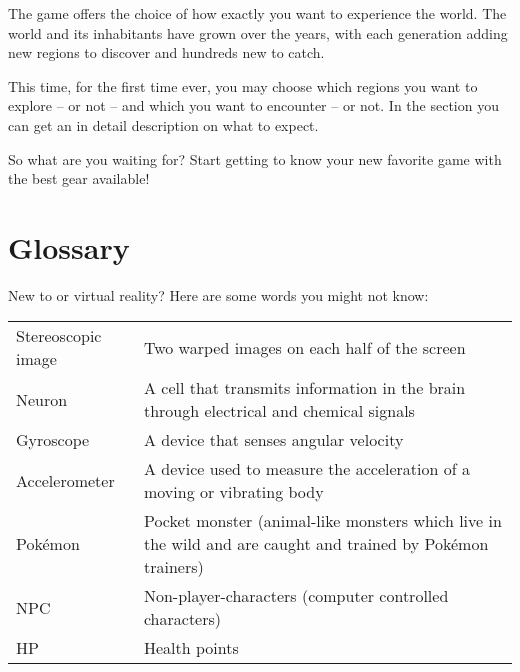 The game offers the choice of how exactly you want to experience the \poke{} world. The world and its inhabitants have grown over the years, with each generation adding new regions to discover and hundreds new \poke{} to catch.

This time, for the first time ever, you may choose which regions you want to explore -- or not -- and which  \poke{} you want to encounter -- or not. In the section \textit{} you can get an in detail description on what to expect. \medskip

So what are you waiting for? Start getting to know your new favorite \poke{} game with the best gear available!

\section{Glossary}
New to \poke{} or virtual reality? Here are some words you might not know:\\
\begin{tabular}{L{.3}L{.7}}
Stereoscopic image & Two warped images on each half of the screen\\
Neuron \newline & A cell that transmits information in the brain through electrical and chemical signals\\
Gyroscope & A device that senses angular velocity\\
Accelerometer \newline & A device used to measure the acceleration of a moving or vibrating body\\
Pokémon\newline & Pocket monster (animal-like monsters which live in the wild and are caught and trained by Pokémon trainers)\\
NPC & Non-player-characters (computer controlled characters)\\
HP & Health points\\
\end{tabular}

